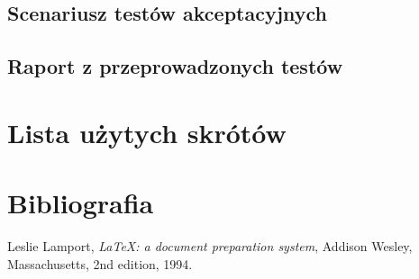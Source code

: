\documentclass[10pt,a4paper]{article}
\begin{document}
\subsection{Scenariusz testów akceptacyjnych}

\subsection{Raport z przeprowadzonych testów}

\section{Lista użytych skrótów}

\renewcommand*{\refname}{\vspace*{-2em}}
\section{Bibliografia}
\begin{thebibliography}{99}
  Leslie Lamport,
  \emph{\LaTeX: a document preparation system},
  Addison Wesley, Massachusetts,
  2nd edition,
  1994.
\end{thebibliography}
\end{document}
